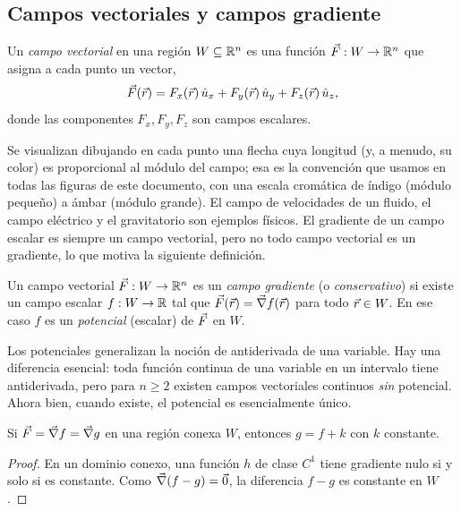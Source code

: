 \subsection{Campos vectoriales y campos gradiente}\label{sec:vectoriales}
\begin{definicion}\label{def:vectorial}
Un \emph{campo vectorial} en una región $W\subseteq\mathbb{R}^{n}$ es una función
$\vec{F}:W\to\mathbb{R}^{n}$ que asigna a cada punto un vector,
\[
  \vec{F}(\vec{r})=F_x(\vec{r})\,\hat{u}_{x}+F_y(\vec{r})\,\hat{u}_{y}+F_z(\vec{r})\,\hat{u}_{z} ,
\]
donde las componentes $F_x,F_y,F_z$ son campos escalares.
\end{definicion}

Se visualizan dibujando en cada punto una flecha cuya longitud (y, a menudo, su
color) es proporcional al módulo del campo; esa es la convención que usamos en
todas las figuras de este documento, con una escala cromática de índigo
(módulo pequeño) a ámbar (módulo grande). El campo de velocidades de un fluido,
el campo eléctrico y el gravitatorio son ejemplos físicos. El gradiente de un
campo escalar es siempre un campo vectorial, pero no todo campo vectorial es un
gradiente, lo que motiva la siguiente definición.

\begin{definicion}\label{def:campo-gradiente}
Un campo vectorial $\vec{F}:W\to\mathbb{R}^{n}$ es un \emph{campo gradiente}
(o \emph{conservativo}) si existe un campo escalar $f:W\to\mathbb{R}$ tal que
$\vec{F}(\vec{r})=\vec{\nabla} f(\vec{r})$ para todo $\vec{r}\in W$. En ese caso $f$ es un
\emph{potencial} (escalar) de $\vec{F}$ en $W$.
\end{definicion}

Los potenciales generalizan la noción de antiderivada de una variable. Hay una
diferencia esencial: toda función continua de una variable en un intervalo
tiene antiderivada, pero para $n\ge2$ existen campos vectoriales continuos
\emph{sin} potencial. Ahora bien, cuando existe, el potencial es esencialmente
único.

\begin{proposicion}\label{prop:unicidad-potencial}
Si $\vec{F}=\vec{\nabla} f=\vec{\nabla} g$ en una región conexa $W$, entonces $g=f+k$ con $k$
constante.
\end{proposicion}
\begin{proof}
En un dominio conexo, una función $h$ de clase $C^{1}$ tiene gradiente nulo si y
solo si es constante. Como $\vec{\nabla}(f-g)=\vec{0}$, la diferencia $f-g$ es
constante en $W$.
\end{proof}

